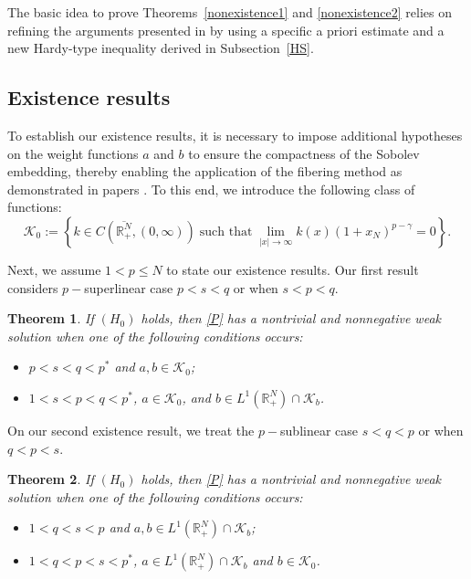 \documentclass[12pt,reqno]{amsart}
\newtheorem{theorem}{Theorem}[section]
\begin{document}
The basic idea to prove Theorems~\ref{nonexistence1} and \ref{nonexistence2} relies on refining the arguments presented in \cite{zbMATH05640324} by using a specific a priori estimate and a new Hardy-type inequality derived in Subsection~\ref{HS}.

\subsection{Existence results}
To establish our existence results, it is necessary to impose additional hypotheses on the weight functions $a$ and $b$ to ensure the compactness of the Sobolev embedding, thereby enabling the application of the fibering method as demonstrated in papers \cite{zbMATH05077864,zbMATH05640324}. 
To this end, we introduce the following class of functions:
\begin{equation*}
 \mathcal{K}_0:=\left\{k\in C(\overline{\mathds{R}^N_+},(0,\infty))\;\mbox{such that}\;\lim_{|x|\rightarrow\infty}k(x)(1+x_N)^{p-\gamma}=0\right\}.   
 \end{equation*}


 
Next, we assume $1 < p \leq N$ to state our existence results.  Our first result considers $p-$superlinear case $p < s < q $ or when  $ s < p < q $.

\begin{theorem}\label{Primeiro Existencia} If $(H_0)$ holds, then \eqref{P} has a nontrivial and nonnegative weak solution when one of the following conditions occurs:
\begin{itemize}
    \item[i)] $p < s < q < p^*$ and $a, b \in \mathcal{K}_0$;
    \item[ii)] $1 < s < p < q < p^*$, $a \in \mathcal{K}_0$, and $b \in L^1(\mathds{R}^N_+) \cap \mathcal{K}_b$.
\end{itemize}
\end{theorem}

On our second existence result, we treat the $p-$sublinear case $  s < q <p $ or when  $ q < p < s $.

\begin{theorem}\label{Segundo Existencia} If $(H_0)$ holds,  then \eqref{P} has a nontrivial and nonnegative weak solution when one of the following conditions occurs:
\begin{itemize}
\item[i)] $1<q<s<p$ and $a,b \in L^1(\mathds{R}^N_+)\cap \mathcal{K}_b$;
\item[ii)] $1<q<p<s<p^*$, $a\in L^1(\mathds{R}^N_+)\cap \mathcal{K}_b$ and $b \in \mathcal{K}_0$.
\end{itemize}
\end{theorem}
\end{document}
